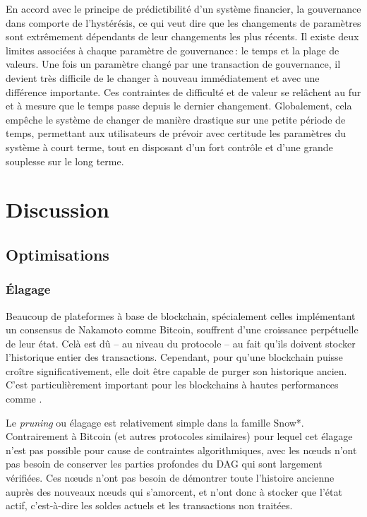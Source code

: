 \documentclass[runningheads,francais,a4paper]{llncs}
\begin{document}
En accord avec le principe de prédictibilité d'un système financier, la gouvernance dans \AVATokenName{} comporte de
l'hystérésis, ce qui veut dire que les changements de paramètres sont extrêmement dépendants de leur changements les
plus récents. Il existe deux limites associées à chaque paramètre de gouvernance\,: le temps et la plage de valeurs. Une fois
un paramètre changé par une transaction de gouvernance, il devient très difficile de le changer à nouveau immédiatement
et avec une différence importante. Ces contraintes de difficulté et de valeur se relâchent au fur et à mesure que le
temps passe depuis le dernier changement. Globalement, cela empêche le système de changer de manière drastique sur une
petite période de temps, permettant aux utilisateurs de prévoir avec certitude les paramètres du système à court terme,
tout en disposant d'un fort contrôle et d'une grande souplesse sur le long terme.

\section{Discussion}
\label{section:discussion}
\subsection{Optimisations}
\subsubsection{Élagage}
Beaucoup de plateformes à base de blockchain, spécialement celles implémentant un consensus de Nakamoto comme Bitcoin,
souffrent d'une croissance perpétuelle de leur état. Celà est dû -- au niveau du protocole -- au fait qu'ils doivent
stocker l'historique entier des transactions. Cependant, pour qu'une blockchain puisse croître significativement, elle
doit être capable de purger son historique ancien. C'est particulièrement important pour les blockchains à hautes
performances comme \AVAPlatformName{}.

Le \emph{pruning} ou élagage est relativement simple dans la famille Snow*. Contrairement à Bitcoin (et autres
protocoles similaires) pour lequel cet élagage n'est pas possible pour cause de contraintes algorithmiques, avec
\AVATokenName{} les nœuds n'ont pas besoin de conserver les parties profondes du DAG qui sont largement vérifiées. Ces
nœuds n'ont pas besoin de démontrer toute l'histoire ancienne auprès des nouveaux nœuds qui s'amorcent, et n'ont donc à
stocker que l'état actif, c'est-à-dire les soldes actuels et les transactions non traitées.
\end{document}

